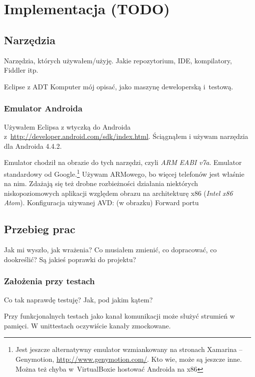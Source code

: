 \chapter{Implementacja (TODO)}

\section{Narzędzia}
Narzędzia, których używałem/użyję. Jakie repozytorium, IDE, kompilatory, Fiddler itp.

Eclipse z ADT
Komputer mój opisać, jako maszynę deweloperską i~testową.

\subsection{Emulator Androida}
\label{android-emulator}
Używałem Eclipsa z wtyczką do Androida z~\url{http://developer.android.com/sdk/index.html}.
Ściągnąłem i używam narzędzia dla Androida 4.4.2.

Emulator chodził na obrazie do tych narzędzi, czyli \emph{ARM EABI v7a}. Emulator standardowy od Google.\footnote{Jest jeszcze alternatywny emulator wzmiankowany na stronach Xamarina -- Genymotion, \url{http://www.genymotion.com/}. Kto wie, może są jeszcze inne. Można też chyba w~VirtualBoxie hostować Androida na x86}
Używam ARMowego, bo więcej telefonów jest właśnie na nim. Zdażają się też drobne rozbieżności działania niektórych niskopoziomowych aplikacji względem obrazu na architekturę x86 (\emph{Intel x86 Atom}).
Konfiguracja używanej AVD: (w obrazku)
Forward portu

\section{Przebieg prac}
Jak mi wyszło, jak wrażenia? Co musiałem zmienić, co dopracować, co dookreślić? Są jakieś poprawki do projektu?

\subsection{Założenia przy testach}
Co tak naprawdę testuję? Jak, pod jakim kątem?

Przy funkcjonalnych testach jako kanał komunikacji może służyć strumień w pamięci. W unittestach oczywiście kanały zmockowane.
